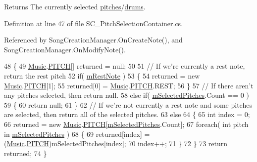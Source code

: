 \begin{DoxyReturn}{Returns}
The currently selected \hyperlink{group___music_enums_ga508f69b199ea518f935486c990edac1d}{pitches}/\hyperlink{group___music_enums_gade475b4382c7066d1af13e7c13c029b6}{drums}. 
\end{DoxyReturn}


Definition at line 47 of file S\+C\+\_\+\+Pitch\+Selection\+Container.\+cs.



Referenced by Song\+Creation\+Manager.\+On\+Create\+Note(), and Song\+Creation\+Manager.\+On\+Modify\+Note().


\begin{DoxyCode}
48     \{
49         \hyperlink{class_music}{Music}.\hyperlink{group___music_enums_ga508f69b199ea518f935486c990edac1d}{PITCH}[] returned = null;
50 
51         \textcolor{comment}{// If we're currently a rest note, return the rest pitch}
52         \textcolor{keywordflow}{if}( \hyperlink{group___s_c___p_s_c_priv_var_ga6eec175f775c35e2d0eb51dfe6def49f}{mRestNote} )
53         \{
54             returned = \textcolor{keyword}{new} \hyperlink{class_music}{Music}.\hyperlink{group___music_enums_ga508f69b199ea518f935486c990edac1d}{PITCH}[1];
55             returned[0] = \hyperlink{class_music}{Music}.\hyperlink{group___music_enums_ga508f69b199ea518f935486c990edac1d}{PITCH}.REST;
56         \}
57         \textcolor{comment}{// If there aren't any pitches selected, then return null.}
58         \textcolor{keywordflow}{else} \textcolor{keywordflow}{if}( \hyperlink{group___s_c___p_s_c_priv_var_ga5a8a5c31158f6af7f0c17d4fd03c5641}{mSelectedPitches}.Count == 0 )
59         \{
60             \textcolor{keywordflow}{return} null;
61         \}
62         \textcolor{comment}{// If we're not currently a rest note and some pitches are selected, then return all of the
       selected pitches.}
63         \textcolor{keywordflow}{else}
64         \{
65             \textcolor{keywordtype}{int} index = 0;
66             returned = \textcolor{keyword}{new} \hyperlink{class_music}{Music}.\hyperlink{group___music_enums_ga508f69b199ea518f935486c990edac1d}{PITCH}[\hyperlink{group___s_c___p_s_c_priv_var_ga5a8a5c31158f6af7f0c17d4fd03c5641}{mSelectedPitches}.Count];
67             \textcolor{keywordflow}{foreach}( \textcolor{keywordtype}{int} pitch \textcolor{keywordflow}{in} \hyperlink{group___s_c___p_s_c_priv_var_ga5a8a5c31158f6af7f0c17d4fd03c5641}{mSelectedPitches} )
68             \{
69                 returned[index] = (\hyperlink{class_music}{Music}.\hyperlink{group___music_enums_ga508f69b199ea518f935486c990edac1d}{PITCH})mSelectedPitches[index];
70                 index++;
71             \}
72         \}
73         \textcolor{keywordflow}{return} returned;
74     \}
\end{DoxyCode}
\mbox{\label{group___s_c___p_s_c_pub_func_ga678ef561c5418e4bf43a5f9ed753f0f0}} 
